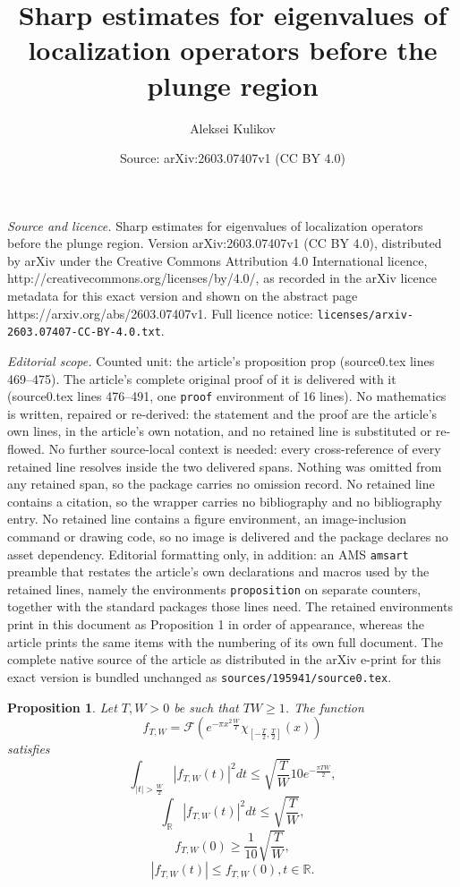 \documentclass[10pt,a4paper]{amsart}
\title{Sharp estimates for eigenvalues of localization operators before the plunge region}
\author{Aleksei Kulikov}
\date{Source: arXiv:2603.07407v1 (CC BY 4.0)}
\newtheorem{proposition}{Proposition}
\newcommand{\F}{\mathcal{F}}
\newcommand{\R}{\mathbb{R}}
\begin{document}
\maketitle

\noindent\emph{Source and licence.} Sharp estimates for eigenvalues of localization operators before the plunge region. Version arXiv:2603.07407v1 (CC BY 4.0), distributed by arXiv under the Creative Commons Attribution 4.0 International licence, http://creativecommons.org/licenses/by/4.0/, as recorded in the arXiv licence metadata for this exact version and shown on the abstract page https://arxiv.org/abs/2603.07407v1. Full licence notice: \texttt{licenses/arxiv-2603.07407-CC-BY-4.0.txt}.\par\smallskip

\noindent\textit{Editorial scope.} Counted unit: the article's proposition prop (source0.tex lines 469--475). The article's complete original proof of it is delivered with it (source0.tex lines 476--491, one \texttt{proof} environment of 16 lines). No mathematics is written, repaired or re-derived: the statement and the proof are the article's own lines, in the article's own notation, and no retained line is substituted or re-flowed.  No further source-local context is needed: every cross-reference of every retained line resolves inside the two delivered spans.  Nothing was omitted from any retained span, so the package carries no omission record.  No retained line contains a citation, so the wrapper carries no bibliography and no bibliography entry.  No retained line contains a figure environment, an image-inclusion command or drawing code, so no image is delivered and the package declares no asset dependency.  Editorial formatting only, in addition: an AMS \texttt{amsart} preamble that restates the article's own declarations and macros used by the retained lines, namely the environments \texttt{proposition} on separate counters, together with the standard packages those lines need.  The retained environments print in this document as Proposition 1 in order of appearance, whereas the article prints the same items with the numbering of its own full document.  The complete native source of the article as distributed in the arXiv e-print for this exact version is bundled unchanged as \texttt{sources/195941/source0.tex}.
\begin{proposition}\label{function prop}
Let $T, W>0$ be such that $TW \ge 1$. The function $$f_{T, W} =\F \left(e^{-\pi x^2 \frac{W}{T}}\chi_{[-\frac{T}{2},\frac{T}{2}]}(x)\right)$$ satisfies
$$\int_{|t| >\frac{W}{2}} |f_{T,W}(t)|^2dt \le \sqrt{\frac{T}{W}}10e^{-\frac{\pi TW}{2}},$$
$$\int_{\R} |f_{T,W}(t)|^2dt\le \sqrt{\frac{T}{W}},$$
$$f_{T, W}(0)\ge \frac{1}{10}\sqrt{\frac{T}{W}},$$
$$|f_{T,W}(t)|\le f_{T,W}(0), t\in\R.$$
\end{proposition}
\end{document}
